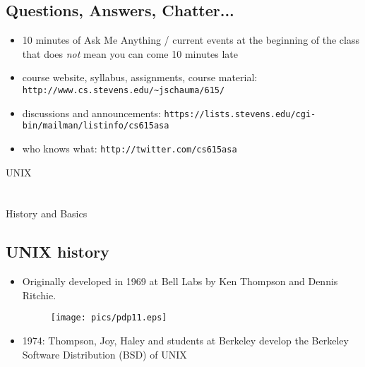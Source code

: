 \documentclass[xga]{xdvislides}
\begin{document}
\subsection{Questions, Answers, Chatter...}
\begin{itemize}
	\item 10 minutes of Ask Me Anything / current events at the beginning of the class \\
		\small that does {\em not} mean you can come 10 minutes late \Normalsize
	\\

	\item course website, syllabus, assignments, course material:\\
		\verb+http://www.cs.stevens.edu/~jschauma/615/+
	\\

	\item discussions and announcements:
		\verb+https://lists.stevens.edu/cgi-bin/mailman/listinfo/cs615asa+
	\\

	\item who knows what: \verb+http://twitter.com/cs615asa+
\end{itemize}

\newpage
\vspace*{\fill}
\begin{center}
    \Hugesize
        UNIX \\ [1em]
    \hspace*{5mm}
    \blueline\\
    \hspace*{5mm}\\
        History and Basics
\end{center}
\vspace*{\fill}


\subsection{UNIX history}
\begin{itemize}
	\item Originally developed in 1969 at Bell Labs by Ken Thompson
		and Dennis Ritchie.

\begin{figure}[hb]
	\begin{center}
		\texttt{[image: pics/pdp11.eps]} \\
	\end{center}
\end{figure}

	\item 1974: Thompson, Joy, Haley and students at Berkeley develop
		the Berkeley Software Distribution (BSD) of UNIX
\end{itemize}
\end{document}
